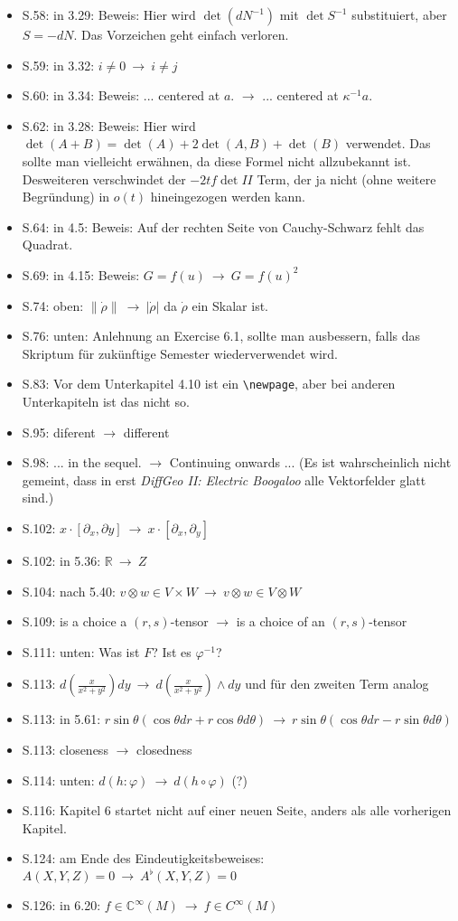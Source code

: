 \documentclass[a4paper,11pt,notitlepage,fullpage]{article}
\newcommand{\s}{\item S.}
\begin{document}
\begin{itemize}
\s 58: in 3.29: Beweis: Hier wird $\det(dN^{-1})$ mit $\det S^{-1}$ substituiert, aber $S = - dN$. Das Vorzeichen geht einfach verloren.
\s 59: in 3.32: $i \neq 0 ~\rightarrow~ i \neq j$
\s 60: in 3.34: Beweis: ... centered at $a$. $\rightarrow$ ... centered at $\kappa^{-1} a$.
\s 62: in 3.28: Beweis: Hier wird $\det(A+B) = \det(A) + 2\det(A, B) + \det(B)$ verwendet. Das sollte man vielleicht erwähnen, da diese Formel nicht allzubekannt ist. Desweiteren verschwindet der $-2tf\det II$ Term, der ja nicht (ohne weitere Begründung) in $o(t)$ hineingezogen werden kann.
\s 64: in 4.5: Beweis: Auf der rechten Seite von Cauchy-Schwarz fehlt das Quadrat.
\s 69: in 4.15: Beweis: $G = f(u) ~\rightarrow~ G = f(u)^2$
\s 74: oben: $\|\dot \rho\| ~\rightarrow~ |\dot\rho|$ da $\dot\rho$ ein Skalar ist.
\s 76: unten: Anlehnung an Exercise 6.1, sollte man ausbessern, falls das Skriptum für zukünftige Semester wiederverwendet wird.
\s 83: Vor dem Unterkapitel 4.10 ist ein \verb+\newpage+, aber bei anderen Unterkapiteln ist das nicht so.
\s 95: diferent $\rightarrow$ different
\s 98: ... in the sequel. $\rightarrow$ Continuing onwards ... (Es ist wahrscheinlich nicht gemeint, dass in erst \emph{DiffGeo II: Electric Boogaloo} alle Vektorfelder glatt sind.)
\s 102: $x \cdot [\partial_x, \partial y] ~\rightarrow~ x \cdot [\partial_x, \partial_y]$
\s 102: in 5.36: $\mathbb R ~\rightarrow~ Z$
\s 104: nach 5.40: $v \otimes w \in V \times W ~\rightarrow~ v \otimes w \in V \otimes W$
\s 109: is a choice a $(r, s)$-tensor $\rightarrow$ is a choice of an $(r, s)$-tensor
\s 111: unten: Was ist $F$? Ist es $\varphi^{-1}$?
\s 113: $d(\frac{x}{x^2+y^2})dy ~\rightarrow~ d(\frac{x}{x^2+y^2})\wedge dy$ und für den zweiten Term analog
\s 113: in 5.61: $r \sin \theta (\cos \theta dr + r \cos \theta d\theta) ~\rightarrow~ r \sin \theta (\cos \theta dr - r \sin \theta d\theta)$
\s 113: closeness $\rightarrow$ closedness
\s 114: unten: $d(h: \varphi) ~\rightarrow~ d(h\circ \varphi)$ (?)
\s 116: Kapitel 6 startet nicht auf einer neuen Seite, anders als alle vorherigen Kapitel.
\s 124: am Ende des Eindeutigkeitsbeweises: $A(X,Y,Z) = 0 ~\rightarrow~ A^\flat(X,Y,Z) = 0$
\s 126: in 6.20: $f \in \mathbb C^\infty(M) ~\rightarrow~ f \in C^\infty(M)$





\end{itemize}
\end{document}
